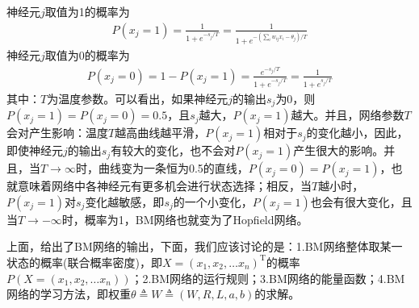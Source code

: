 {\begin{figure}[H]
            \end{figure}
            神经元$j$取值为1的概率为
            \begin{align*}
            P(x_j = 1) = \frac{1}{1+e^{-s_j/T}} = \frac{1}{1+e^{-\left( \sum_{i} w_{ij}x_i - \theta_j \right) /T}}
            \end{align*}
            神经元$j$取值为0的概率为
            \begin{align*}
            P(x_j = 0) = 1-P(x_j = 1) = \frac{e^{-s_j/T}}{1+e^{-s_j/T}} = \frac{1}{1+e^{s_j/T}}
            \end{align*}
            其中：$T$为温度参数。可以看出，如果神经元$j$的输出$s_j$为0，则$P(x_j=1) = P(x_j=0) = 0.5$，且$s_j$越大，$P(x_j=1)$越大。并且，网络参数$T$会对产生影响：温度$T$越高曲线越平滑，$P(x_j=1)$相对于$s_j$的变化越小，因此，即使神经元$j$的输出$s_j$有较大的变化，也不会对$P(x_j=1)$产生很大的影响。并且，当$T\rightarrow \infty$时，曲线变为一条恒为0.5的直线，$P(x_j=0)=P(x_j=1)$，也就意味着网络中各神经元有更多机会进行状态选择；相反，当$T$越小时，$P(x_j=1)$对$s_j$变化越敏感，即$s_j$的一个小变化，$P(x_j=1)$也会有很大变化，且当$T\rightarrow -\infty$时，概率为1，BM网络也就变为了Hopfield网络。
            \par
            上面，给出了BM网络的输出，下面，我们应该讨论的是：1.BM网络整体取某一状态的概率(联合概率密度)，即$X = (x_1,x_2,\dots x_n)^\mathrm{T}$的概率$P(X =(x_1,x_2,\dots x_n)) $；2.BM网络的运行规则；3.BM网络的能量函数；4.BM网络的学习方法，即权重$\theta \triangleq W \triangleq (W,R,L,a,b)$的求解。

}
